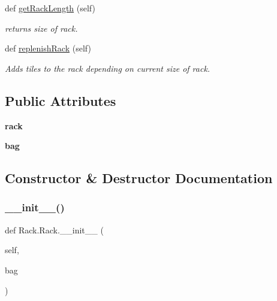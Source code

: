 \begin{DoxyCompactItemize}
def \hyperlink{class_rack_1_1_rack_af4100c91dbee6c72572c6fbbf95c13ac}{get\+Rack\+Length} (self)
\begin{DoxyCompactList}\small\item\em returns size of rack. \end{DoxyCompactList}\item 
def \hyperlink{class_rack_1_1_rack_af35674a6e6b76c0809f7175eb126c045}{replenish\+Rack} (self)
\begin{DoxyCompactList}\small\item\em Adds tiles to the rack depending on current size of rack. \end{DoxyCompactList}\end{DoxyCompactItemize}
\subsection*{Public Attributes}
\begin{DoxyCompactItemize}
\item 
\mbox{\label{class_rack_1_1_rack_aa5de076782a73a1a0e2f45df5fd83888}} 
{\bfseries rack}
\item 
\mbox{\label{class_rack_1_1_rack_a78ffaa68859db27b0f8661f2c925aa59}} 
{\bfseries bag}
\end{DoxyCompactItemize}


\subsection{Constructor \& Destructor Documentation}
\mbox{\label{class_rack_1_1_rack_aa94c480c8e59818b31e429bceb2be401}} 
\subsubsection{\texorpdfstring{\+\_\+\+\_\+init\+\_\+\+\_\+()}{\_\_init\_\_()}}
{\footnotesize\ttfamily def Rack.\+Rack.\+\_\+\+\_\+init\+\_\+\+\_\+ (\begin{DoxyParamCaption}\item[{}]{self,  }\item[{}]{bag }\end{DoxyParamCaption})}



